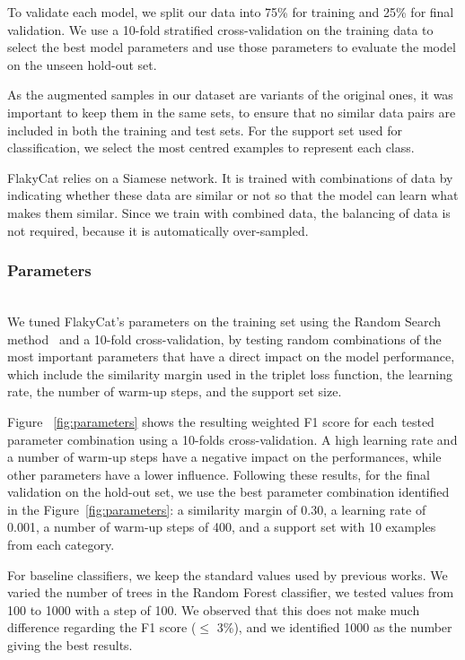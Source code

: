 To validate each model, we split our data into 75\% for training and 25\% for final validation. We use a 10-fold stratified cross-validation on the training data to select the best model parameters and use those parameters to evaluate the model on the unseen hold-out set.

As the augmented samples in our dataset are variants of the original ones, it was important to keep them in the same sets, to ensure that no similar data pairs are included in both the training and test sets. For the support set used for classification, we select the most centred examples to represent each class. 

FlakyCat relies on a Siamese network. It is trained with combinations of data by indicating whether these data are similar or not so that the model can learn what makes them similar. Since we train with combined data, the balancing of data is not required, because it is automatically over-sampled.



\subsubsection{Parameters}
~~ \\
We tuned FlakyCat's parameters on the training set using the Random Search method~\cite{bergstra2012random} and a 10-fold cross-validation, by testing random combinations of the most important parameters that have a direct impact on the model performance, which include the similarity margin used in the triplet loss function, the learning rate, the number of warm-up steps, and the support set size.

Figure ~\ref{fig:parameters} shows the resulting weighted F1 score for each tested parameter combination using a 10-folds cross-validation. A high learning rate and a number of warm-up steps have a negative impact on the performances, while other parameters have a lower influence.  Following these results, for the final validation on the hold-out set, we use the best parameter combination identified in the Figure~\ref{fig:parameters}: a similarity margin of 0.30, a learning rate of 0.001, a number of warm-up steps of 400, and a support set with 10 examples from each category.

For baseline classifiers, we keep the standard values used by previous works. We varied the number of trees in the Random Forest classifier, we tested values from 100 to 1000 with a step of 100.
We observed that this does not make much difference regarding the F1 score ($\leq$ 3\%), and we identified 1000 as the number giving the best results. 


